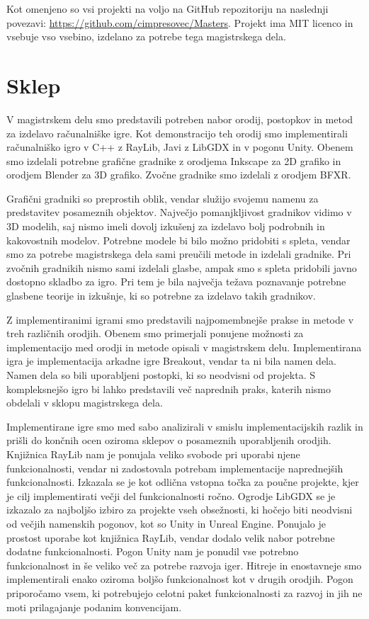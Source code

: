 \documentclass[12pt,a4paper,twoside]{book}
\begin{document}
Kot omenjeno so vsi projekti na voljo na GitHub repozitoriju na naslednji povezavi: \url{https://github.com/cimpresovec/Masters}. Projekt ima MIT licenco in vsebuje vso vsebino, izdelano za potrebe tega magistrskega dela.

\chapter{Sklep}\thispagestyle{fancy}
V magistrskem delu smo predstavili potreben nabor orodij, postopkov in metod za izdelavo računalniške igre. Kot demonstracijo teh orodij smo implementirali računalniško igro v C++ z RayLib, Javi z LibGDX in v pogonu Unity. Obenem smo izdelali potrebne grafične gradnike z orodjema Inkscape za 2D grafiko in orodjem Blender za 3D grafiko. Zvočne gradnike smo izdelali z orodjem BFXR.

Grafični gradniki so preprostih oblik, vendar služijo svojemu namenu za predstavitev posameznih objektov. Največjo pomanjkljivost gradnikov vidimo v 3D modelih, saj nismo imeli dovolj izkušenj za izdelavo bolj podrobnih in kakovostnih modelov. Potrebne modele bi bilo možno pridobiti s spleta, vendar smo za potrebe magistrskega dela sami preučili metode in izdelali gradnike. Pri zvočnih gradnikih nismo sami izdelali glasbe, ampak smo s spleta pridobili javno dostopno skladbo za igro. Pri tem je bila največja težava poznavanje potrebne glasbene teorije in izkušnje, ki so potrebne za izdelavo takih gradnikov.

Z implementiranimi igrami smo predstavili najpomembnejše prakse in metode v treh različnih orodjih. Obenem smo primerjali ponujene možnosti za implementacijo med orodji in metode opisali v magistrskem delu. Implementirana igra je implementacija arkadne igre Breakout, vendar ta ni bila namen dela. Namen dela so bili uporabljeni postopki, ki so neodvisni od projekta. S kompleksnejšo igro bi lahko predstavili več naprednih praks, katerih nismo obdelali v sklopu magistrskega dela.

Implementirane igre smo med sabo analizirali v smislu implementacijskih razlik in prišli do končnih ocen oziroma sklepov o posameznih uporabljenih orodjih. Knjižnica RayLib nam je ponujala veliko svobode pri uporabi njene funkcionalnosti, vendar ni zadostovala potrebam implementacije naprednejših funkcionalnosti. Izkazala se je kot odlična vstopna točka za poučne projekte, kjer je cilj implementirati večji del funkcionalnosti ročno. Ogrodje LibGDX se je izkazalo za najboljšo izbiro za projekte vseh obsežnosti, ki hočejo biti neodvisni od večjih namenskih pogonov, kot so Unity in Unreal Engine. Ponujalo je prostost uporabe kot knjižnica RayLib, vendar dodalo velik nabor potrebne dodatne funkcionalnosti. Pogon Unity nam je ponudil vse potrebno funkcionalnost in še veliko več za potrebe razvoja iger. Hitreje in enostavneje smo implementirali enako oziroma boljšo funkcionalnost kot v drugih orodjih. Pogon priporočamo vsem, ki potrebujejo celotni paket funkcionalnosti za razvoj in jih ne moti prilagajanje podanim konvencijam.
\end{document}
